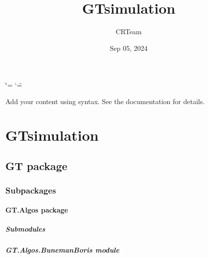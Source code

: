 \documentclass[letterpaper,10pt,english]{sphinxmanual}
\title{GTsimulation}
\date{Sep 05, 2024}
\author{CRTeam}
\begin{document}
\ifdefined\shorthandoff
  \ifnum\catcode`\=\string=\active\shorthandoff{=}\fi
  \ifnum\catcode`\"=\active{}\fi
\fi

\pagestyle{empty}
\sphinxmaketitle
\pagestyle{plain}
\sphinxtableofcontents
\pagestyle{normal}
\label{\detokenize{index::doc}}


\sphinxAtStartPar
Add your content using  syntax. See the
documentation for details.

\sphinxstepscope


\chapter{GTsimulation}
\label{\detokenize{modules:gtsimulation}}\label{\detokenize{modules::doc}}
\sphinxstepscope


\section{GT package}
\label{\detokenize{GT:gt-package}}\label{\detokenize{GT::doc}}

\subsection{Subpackages}
\label{\detokenize{GT:subpackages}}
\sphinxstepscope


\subsubsection{GT.Algos package}
\label{\detokenize{GT.Algos:gt-algos-package}}\label{\detokenize{GT.Algos::doc}}

\paragraph{Submodules}
\label{\detokenize{GT.Algos:submodules}}

\paragraph{GT.Algos.BunemanBoris module}
\label{\detokenize{GT.Algos:module-GT.Algos.BunemanBoris}}\label{\detokenize{GT.Algos:gt-algos-bunemanboris-module}}
\end{document}
